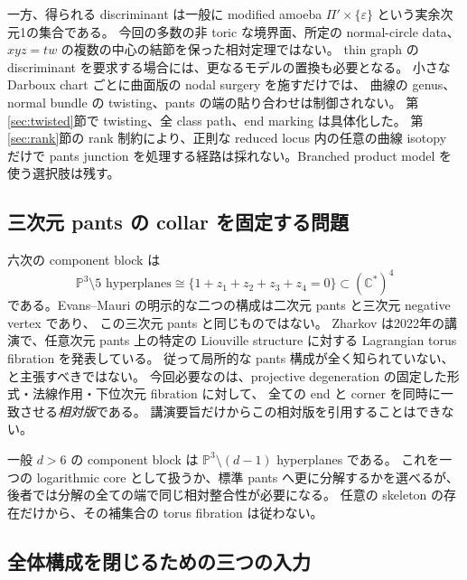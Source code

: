 \documentclass[11pt,a4paper]{article}
\theoremstyle{definition}
\newcommand{\PP}{\mathbb P}
\newcommand{\CC}{\mathbb C}
\newcommand{\eps}{\varepsilon}
\begin{document}
一方、得られる discriminant は一般に modified amoeba
$\Pi'\times\{\eps\}$ という実余次元1の集合である。
今回の多数の非 toric な境界面、所定の normal-circle data、
$xyz=tw$ の複数の中心の結節を保った相対定理ではない。
thin graph の discriminant を要求する場合には、更なるモデルの置換も必要となる。
小さな Darboux chart ごとに曲面版の nodal surgery を施すだけでは、
曲線の genus、normal bundle の twisting、pants の端の貼り合わせは制御されない。
第\ref{sec:twisted}節で twisting、全 class path、end marking は具体化した。
第\ref{sec:rank}節の rank 制約により、正則な reduced locus 内の任意の曲線 isotopy だけで
pants junction を処理する経路は採れない。Branched product model を使う選択肢は残す。

\subsection{三次元 pants の collar を固定する問題}

六次の component block は
\[
\PP^3\setminus5\text{ hyperplanes}
\cong\{1+z_1+z_2+z_3+z_4=0\}\subset(\CC^*)^4
\]
である。Evans--Mauri の明示的な二つの構成は二次元 pants と三次元 negative vertex であり、
この三次元 pants と同じものではない。
Zharkov は2022年の講演で、任意次元 pants 上の特定の Liouville structure に対する
Lagrangian torus fibration を発表している\cite{zharkov-talk}。
従って局所的な pants 構成が全く知られていない、と主張すべきではない。
今回必要なのは、projective degeneration の固定した形式・法線作用・下位次元 fibration に対して、
全ての end と corner を同時に一致させる\emph{相対版}である。
講演要旨だけからこの相対版を引用することはできない。

一般 $d>6$ の component block は $\PP^3\setminus(d-1)$ hyperplanes である。
これを一つの logarithmic core として扱うか、標準 pants へ更に分解するかを選べるが、
後者では分解の全ての端で同じ相対整合性が必要になる。
任意の skeleton の存在だけから、その補集合の torus fibration は従わない。

\subsection{全体構成を閉じるための三つの入力}
\end{document}
